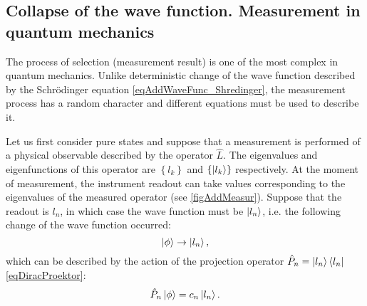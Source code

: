 
\subsection{Collapse of the wave function. Measurement in quantum mechanics}
\label{sec:add:reduction}

The process of selection (measurement result) is one of the most complex in
quantum mechanics. Unlike deterministic change of the wave function described by the Schrödinger
equation \eqref{eqAddWaveFunc_Shredinger}, the measurement process has a random
character and different equations must be used to describe it. 



Let us first consider pure states 
and suppose that a measurement is performed
of a physical observable described by the operator $\hat{L}$. The eigenvalues and eigenfunctions of this operator are $\left\{ l_k \right\}$ and 
$\left\{ \ket{l_k} \right\}$ respectively. At the moment
of measurement, the instrument readout can take values corresponding to
the eigenvalues of the measured operator
(see \autoref{figAddMeasur}). Suppose that the readout 
is $l_n$, in which case the wave function must be 
$\ket{l_n}$, i.e. the following
change of the wave function occurred:
\[
\left| \phi \right> \rightarrow \ket{l_n},
\] 
which can be described by the action of the projection operator 
$\hat{P}_n = \ket{l_n} \bra{l_n}$ \eqref{eqDiracProektor}:
\[
\hat{P}_n \left| \phi \right> = c_n\ket{l_n}.
\]

